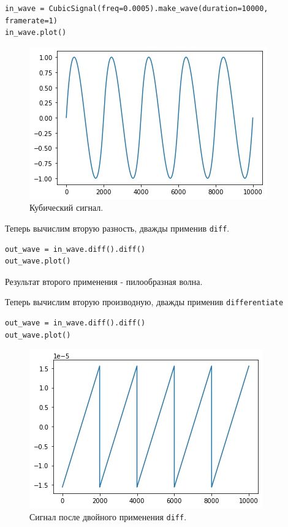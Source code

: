 \documentclass[a4paper, 14pt]{extarticle}
\begin{document}
    \begin{lstlisting}[caption= Кубический сигнал., label={lst:task5_in_cubic}]
in_wave = CubicSignal(freq=0.0005).make_wave(duration=10000, framerate=1)
in_wave.plot()      \end{lstlisting}

    \begin{figure}[h]
        \centering
        \includegraphics[width=0.8\linewidth]{resources/Images/task5_in_cubic}
        \caption{Кубический сигнал.}
        \label{fig:task5_in_cubic}
    \end{figure}

    Теперь вычислим вторую разность, дважды применив \texttt{diff}.

    \begin{lstlisting}[caption= Двойное примнение \texttt{diff}., label={lst:task5_out_diff}]
out_wave = in_wave.diff().diff()
out_wave.plot()     \end{lstlisting}

    Результат второго применения - пилообразная волна.

    Теперь вычислим вторую производную, дважды применив \texttt{differentiate}

    \begin{lstlisting}[caption= Двойное примнение \texttt{differentiate}., label={lst:task5_out_differentiate}]
out_wave = in_wave.diff().diff()
out_wave.plot()     \end{lstlisting}

    \begin{figure}[H]
        \centering
        \includegraphics[width=0.8\linewidth]{resources/Images/task5_out_diff}
        \caption{Сигнал после двойного применения \texttt{diff}.}
        \label{fig:task5_out_diff}
    \end{figure}
\end{document}
